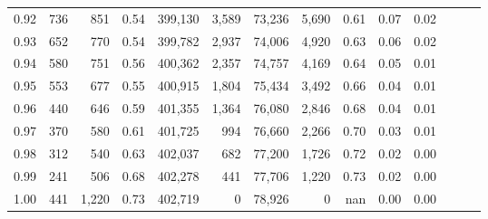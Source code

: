 \begin{tabular}{rrrrrrrrrrrrrr}
0.92 &    736 &    851 &  0.54 &  399,130 &    3,589 &  73,236 &   5,690 &  0.61 &  0.07 &      0.02 \\
0.93 &    652 &    770 &  0.54 &  399,782 &    2,937 &  74,006 &   4,920 &  0.63 &  0.06 &      0.02 \\
0.94 &    580 &    751 &  0.56 &  400,362 &    2,357 &  74,757 &   4,169 &  0.64 &  0.05 &      0.01 \\
0.95 &    553 &    677 &  0.55 &  400,915 &    1,804 &  75,434 &   3,492 &  0.66 &  0.04 &      0.01 \\
0.96 &    440 &    646 &  0.59 &  401,355 &    1,364 &  76,080 &   2,846 &  0.68 &  0.04 &      0.01 \\
0.97 &    370 &    580 &  0.61 &  401,725 &      994 &  76,660 &   2,266 &  0.70 &  0.03 &      0.01 \\
0.98 &    312 &    540 &  0.63 &  402,037 &      682 &  77,200 &   1,726 &  0.72 &  0.02 &      0.00 \\
0.99 &    241 &    506 &  0.68 &  402,278 &      441 &  77,706 &   1,220 &  0.73 &  0.02 &      0.00 \\
1.00 &    441 &  1,220 &  0.73 &  402,719 &        0 &  78,926 &       0 &   nan &  0.00 &      0.00 \\
\bottomrule
\end{tabular}
